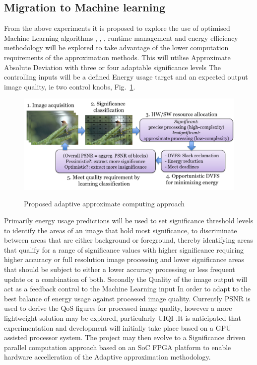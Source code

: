 \documentclass[journal]{IEEEtran}
\begin{document}
\subsection{Migration to Machine learning}
From the above experiments it is proposed to explore the use of optimised Machine Learning algorithms  \cite{Venkataramani2015ce}, \cite{Venkataramani2015ml}, \cite{Raha2015}, runtime management and energy efficiency methodology will be explored to take advantage of the lower computation requirements of the approximation methods. This will utilise Approximate Absolute Deviation with three or four adaptable significance levels The controlling inputs will be a defined Energy usage target and an expected output image quality, ie two control knobs, Fig.~\ref{fig:SigApp}.
\begin{figure}[htbp]
  \centering
    \caption{Proposed adaptive approximate computing approach }
    \includegraphics[width=0.95\columnwidth]{Picture1.png}
  \label{fig:SigApp}
\end{figure}
Primarily energy usage predictions will be used to set significance threshold levels to identify the areas of an image that hold most significance, to discriminate between areas that are either background or foreground, thereby identifying areas that qualify for a range of significance values with higher significance requiring higher accuracy or full resolution image processing and lower significance areas that should be subject to either a lower accuracy processing or less frequent update or a combination of both.  Secondly the Quality of the image output will act as a feedback control to the Machine Learning input In order to adapt to the best balance of energy usage against processed image quality. Currently PSNR is used to derive the QoS figures for processed image quality, however a more lightweight solution \cite{Grigorian2014} may be explored, particularly UIQI \cite{Wang2002}.It is anticipated that experimentation and development will initially take place based on a GPU assisted processor system. The project may then evolve to a Significance driven parallel computation approach based on an SoC FPGA platform to enable hardware accelleration of the Adaptive approximation methodology. 
\end{document}
